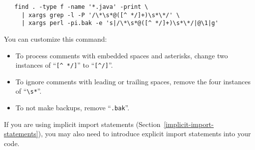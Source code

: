 \begin{Verbatim}
   find . -type f -name '*.java' -print \
     | xargs grep -l -P '/\*\s*@([^ */]+)\s*\*/' \
     | xargs perl -pi.bak -e 's|/\*\s*@([^ */]+)\s*\*/|@\1|g'
\end{Verbatim}

You can customize this command:
\begin{itemize}
\item
To process comments with embedded spaces and asterisks, change 
two instances of ``\verb|[^ */]|'' to ``\verb|[^/]|''.
\item
To ignore comments with leading or trailing spaces, remove the four
instances of ``\verb|\s*|''.  
\item
  To not make backups, remove
``\verb|.bak|''.
\end{itemize}


If you are using implicit import statements
(Section~\ref{implicit-import-statements}), you may also need to introduce
explicit import statements into your code.



